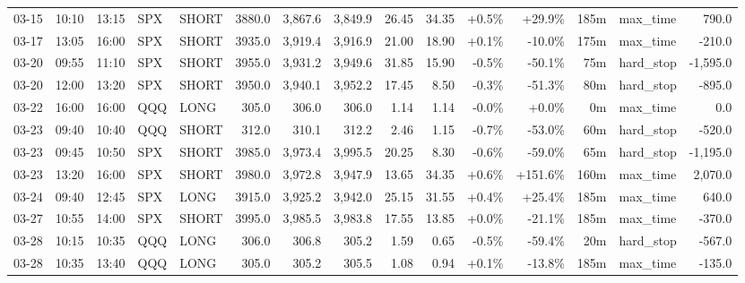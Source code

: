 \documentclass[11pt,a4paper,twoside]{article}
\begin{document}
\begin{landscape}
\begin{center}
\begin{longtable}{>{\color{txtmain}}l l l l l r r r r r r r r >{\color{txtmain}}l r}
03-15 & 10:10 & 13:15 & SPX & SHORT & 3880.0 & 3,867.6 & 3,849.9 & 26.45 & 34.35 & \textcolor{wingreen}{+0.5\%} & \textcolor{wingreen}{+29.9\%} & 185m & max\_time & \textcolor{wingreen}{790.0} \\
03-17 & 13:05 & 16:00 & SPX & SHORT & 3935.0 & 3,919.4 & 3,916.9 & 21.00 & 18.90 & \textcolor{wingreen}{+0.1\%} & \textcolor{lossred}{-10.0\%} & 175m & max\_time & \textcolor{lossred}{-210.0} \\
03-20 & 09:55 & 11:10 & SPX & SHORT & 3955.0 & 3,931.2 & 3,949.6 & 31.85 & 15.90 & \textcolor{lossred}{-0.5\%} & \textcolor{lossred}{-50.1\%} & 75m & hard\_stop & \textcolor{lossred}{-1,595.0} \\
03-20 & 12:00 & 13:20 & SPX & SHORT & 3950.0 & 3,940.1 & 3,952.2 & 17.45 & 8.50 & \textcolor{lossred}{-0.3\%} & \textcolor{lossred}{-51.3\%} & 80m & hard\_stop & \textcolor{lossred}{-895.0} \\
03-22 & 16:00 & 16:00 & QQQ & LONG & 305.0 & 306.0 & 306.0 & 1.14 & 1.14 & \textcolor{lossred}{-0.0\%} & \textcolor{wingreen}{+0.0\%} & 0m & max\_time & \textcolor{wingreen}{0.0} \\
03-23 & 09:40 & 10:40 & QQQ & SHORT & 312.0 & 310.1 & 312.2 & 2.46 & 1.15 & \textcolor{lossred}{-0.7\%} & \textcolor{lossred}{-53.0\%} & 60m & hard\_stop & \textcolor{lossred}{-520.0} \\
03-23 & 09:45 & 10:50 & SPX & SHORT & 3985.0 & 3,973.4 & 3,995.5 & 20.25 & 8.30 & \textcolor{lossred}{-0.6\%} & \textcolor{lossred}{-59.0\%} & 65m & hard\_stop & \textcolor{lossred}{-1,195.0} \\
03-23 & 13:20 & 16:00 & SPX & SHORT & 3980.0 & 3,972.8 & 3,947.9 & 13.65 & 34.35 & \textcolor{wingreen}{+0.6\%} & \textcolor{wingreen}{+151.6\%} & 160m & max\_time & \textcolor{wingreen}{2,070.0} \\
03-24 & 09:40 & 12:45 & SPX & LONG & 3915.0 & 3,925.2 & 3,942.0 & 25.15 & 31.55 & \textcolor{wingreen}{+0.4\%} & \textcolor{wingreen}{+25.4\%} & 185m & max\_time & \textcolor{wingreen}{640.0} \\
03-27 & 10:55 & 14:00 & SPX & SHORT & 3995.0 & 3,985.5 & 3,983.8 & 17.55 & 13.85 & \textcolor{wingreen}{+0.0\%} & \textcolor{lossred}{-21.1\%} & 185m & max\_time & \textcolor{lossred}{-370.0} \\
03-28 & 10:15 & 10:35 & QQQ & LONG & 306.0 & 306.8 & 305.2 & 1.59 & 0.65 & \textcolor{lossred}{-0.5\%} & \textcolor{lossred}{-59.4\%} & 20m & hard\_stop & \textcolor{lossred}{-567.0} \\
03-28 & 10:35 & 13:40 & QQQ & LONG & 305.0 & 305.2 & 305.5 & 1.08 & 0.94 & \textcolor{wingreen}{+0.1\%} & \textcolor{lossred}{-13.8\%} & 185m & max\_time & \textcolor{lossred}{-135.0} \\

\end{longtable}
\end{center}
\end{landscape}
\end{document}
